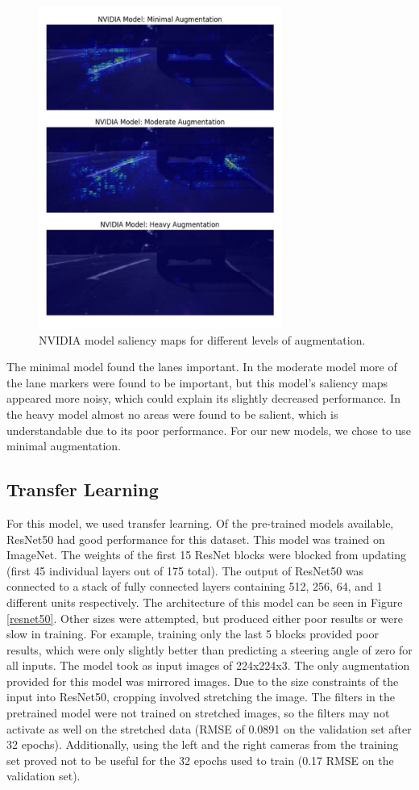 \documentclass[10pt,twocolumn,letterpaper]{article}
\begin{document}
 \begin{figure}[!htb]
 	\includegraphics[width=8cm]{nvidia_aug_test_vert.png}
 	\centering
 	\caption{NVIDIA model saliency maps for different levels of augmentation.}
 	\label{nvidia_aug}
 \end{figure}
 
The minimal model found the lanes important. In the moderate model more of the lane markers were found to be important, but this model's saliency maps appeared more noisy, which could explain its slightly decreased performance. In the heavy model almost no areas were found to be salient, which is understandable due to its poor performance. For our new models, we chose to use minimal augmentation.


\subsection{Transfer Learning}
For this model, we used transfer learning. Of the pre-trained models available, ResNet50 had good performance for this dataset. This model was trained on ImageNet. The weights of the first 15 ResNet blocks were blocked from updating (first 45 individual layers out of 175 total). The output of ResNet50 was connected to a stack of fully connected layers containing 512, 256, 64, and 1 different units respectively. The architecture of this model can be seen in Figure \ref{resnet50}. Other sizes were attempted, but produced either poor results or were slow in training. For example, training only the last 5 blocks provided poor results, which were only slightly better than predicting a steering angle of zero for all inputs. The model took as input images of 224x224x3. The only augmentation provided for this model was mirrored images. Due to the size constraints of the input into ResNet50, cropping involved stretching the image. The filters in the pretrained model were not trained on stretched images, so the filters may not activate as well on the stretched data (RMSE of 0.0891 on the validation set after 32 epochs). Additionally, using the left and the right cameras from the training set proved not to be useful for the 32 epochs used to train (0.17 RMSE on the validation set).
\end{document}
